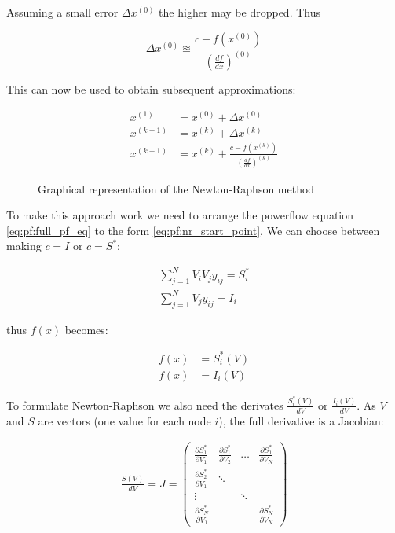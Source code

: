 Assuming a small error $\Delta x^{(0)}$ the higher may be dropped. Thus

\begin{equation}
    \Delta x^{(0)} \approxeq \frac{c - f(x^{(0)}) }{ (\frac{df}{dx})^{(0)} }
\end{equation}

This can now be used to obtain subsequent approximations:

\begin{align}
    x^{(1)}   &= x^{(0)} + \Delta x^{(0)}\\
    x^{(k+1)} &= x^{(k)} + \Delta x^{(k)}\\
    x^{(k+1)} &= x^{(k)} + \frac{c - f(x^{(k)}) }{ (\frac{df}{dx})^{(k)} }
    \label{eq:pf:nr_iteration}
\end{align}

\begin{figure}[H]
    \centering
    
    \caption{
       Graphical representation of the Newton-Raphson method
    }
    \label{fig:pf:nr_graph}
\end{figure}

To make this approach work we need to arrange the powerflow equation \ref{eq:pf:full_pf_eq}
to the form \ref{eq:pf:nr_start_point}. We can choose between making $c = I$ or 
$c = S^*$:

\begin{align}
    \sum_{j = 1}^N V_i V_j y_{ij} = S^*_i\\
    \sum_{j = 1}^N V_j y_{ij} = I_i
    \label{eq:pf:nr_pf_starting_point}
\end{align}

thus $f(x)$ becomes:

\begin{align}
    f(x) &= S^*_i(V)\\
    f(x) &= I_i(V)
\end{align}

To formulate Newton-Raphson we also need the derivates $\frac{S^*_i(V)}{dV}$ or $\frac{I_i(V)}{dV}$. As $V$ and $S$ are vectors
(one value for each node $i$), the full derivative is a Jacobian:

\begin{align}
    \frac{S(V)}{dV} = J = 
    \begin{pmatrix}
        \frac{\partial S^*_1}{\partial V_1} & \frac{\partial S^*_1}{\partial V_2} & \dots  & \frac{\partial S^*_1}{\partial V_N}\\
        \frac{\partial S^*_2}{\partial V_1} & \ddots                              &        &                                    \\
        \vdots                              &                                     & \ddots &                                    \\
        \frac{\partial S^*_N}{\partial V_1} &                                     &        & \frac{\partial S^*_N}{\partial V_N}
    \end{pmatrix}
\end{align}

